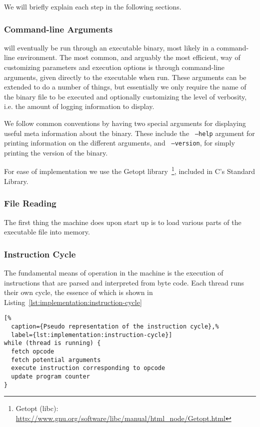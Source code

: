 We will briefly explain each step in the following sections.

\subsubsection{Command-line Arguments}
\thename{} will eventually be run through an executable binary, most likely in a
command-line environment. The most common, and arguably the most efficient, way
of customizing parameters and execution options is through command-line
arguments, given directly to the executable when run. These arguments can be
extended to do a number of things, but essentially we only require the name of
the binary file to be executed and optionally customizing the level of
verbosity, i.e. the amount of logging information to display.

We follow common conventions by having two special arguments for displaying
useful meta information about the \thename{} binary. These include the {\tt
  --help} argument for printing information on the different arguments, and {\tt
  --version}, for simply printing the version of the binary.

For ease of implementation we use the Getopt library~\footnote{Getopt (libc):
  \url{http://www.gnu.org/software/libc/manual/html_node/Getopt.html}}, included
in C's Standard Library.

\subsubsection{File Reading}
The first thing the machine does upon start up is to load various parts of the
executable file into memory. %

\subsubsection{Instruction Cycle}

The fundamental means of operation in the machine is the execution of
instructions that are parsed and interpreted from byte code. Each thread runs
their own cycle, the essence of which is shown in
Listing~\ref{lst:implementation:instruction-cycle}

\begin{lstlisting}[%
  caption={Pseudo representation of the instruction cycle},%
  label={lst:implementation:instruction-cycle}]
while (thread is running) {
  fetch opcode
  fetch potential arguments
  execute instruction corresponding to opcode
  update program counter
}
\end{lstlisting}

